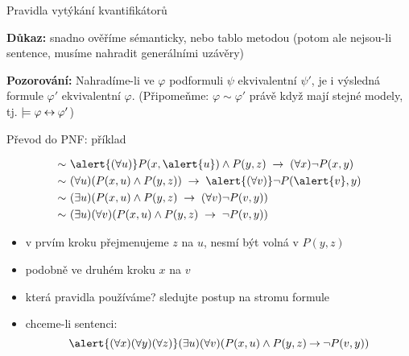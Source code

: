 \documentclass{beamer}
\begin{document}
\begin{frame}{Pravidla vytýkání kvantifikátorů}


    \textbf{Důkaz:} snadno ověříme sémanticky, nebo tablo metodou (potom ale nejsou-li sentence, musíme nahradit generálními uzávěry)\hfill\qedsymbol

    \smallskip

    \textbf{Pozorování:} Nahradíme-li ve $\varphi$ podformuli $\psi$ ekvivalentní $\psi'$, je i výsledná formule $\varphi'$ ekvivalentní $\varphi$. (Připomeňme: $\varphi\sim\varphi'$ právě když mají stejné modely, tj. $\models\varphi\mathbin{\leftrightarrow}\varphi'$)
    
\end{frame}


\begin{frame}{Převod do PNF: příklad}

    \begin{align*}
        \sim &\ 
        \alert{(\forall u)} P(x,\alert{u})\land P(y,z)\ \limplies\ (\forall x)\neg P(x,y)\\ \sim &\ 
        (\forall u)(P(x,u)\land P(y,z))\ \limplies\ \alert{(\forall v)}\neg P(\alert{v},y)\\ \sim &\ 
        (\exists u)( P(x,u)\land P(y,z)\ \limplies\ (\forall v)\neg P(v,y))\\ \sim &\ 
        (\exists u)(\forall v)( P(x,u)\land P(y,z)\ \limplies\ \neg P(v,y))
    \end{align*}
    
    \begin{itemize}
        \item v prvím kroku přejmenujeme $z$ na $u$, \alert{nesmí být volná v $P(y,z)$}
        \item podobně ve druhém kroku $x$ na $v$
        \item která pravidla používáme? sledujte postup na stromu formule
        \item chceme-li sentenci:
        $$
        \alert{(\forall x)(\forall y)(\forall z)}(\exists u)(\forall v)( P(x,u)\land P(y,z)\limplies\neg P(v,y))
        $$
    \end{itemize}

\end{frame}
\end{document}
